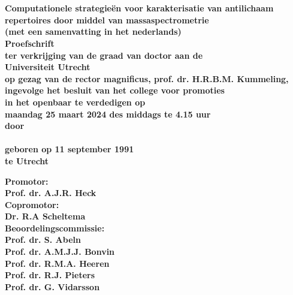 \begin{titlepage}
\begin{flushleft}
    \end{flushleft}
    \clearpage

    \begin{center}
        {\huge \bfseries \thesistitle \par \ }\\
        {\small \bfseries Computationele strategieën voor karakterisatie van antilichaam repertoires door middel van massaspectrometrie\\
        (met een samenvatting in het nederlands)}\\
        [2cm]
        {\Large \bfseries Proefschrift}\\
        \bigskip
        \bigskip
        {\small \bfseries ter verkrijging van de graad van doctor aan de\\
            Universiteit Utrecht\\
            op gezag van de rector magnificus, prof. dr. H.R.B.M. Kummeling,\\
            ingevolge het besluit van het college voor promoties\\
            in het openbaar te verdedigen op\\
            \bigskip
            maandag 25 maart 2024 des middags te 4.15 uur}\\
        [1cm]
        {\small \bfseries door}\\
        [1cm]

        {\large \bfseries\name\\
        \smallskip
        \small geboren op 11 september 1991\\
        te Utrecht}

    \end{center}

    \clearpage

    \begin{flushleft}
        {\bfseries Promotor:\\
            \small Prof. dr. A.J.R. Heck}\\
        \smallskip
        {\bfseries Copromotor:\\
            \small Dr. R.A Scheltema}\\
        \bigskip
        {\bfseries Beoordelingscommissie:\\
            \small Prof. dr. S. Abeln\\
            \small Prof. dr. A.M.J.J. Bonvin\\
            \small Prof. dr. R.M.A. Heeren\\
            \small Prof. dr. R.J. Pieters\\
            \small Prof. dr. G. Vidarsson\\
        }


\end{flushleft}
\end{titlepage}
